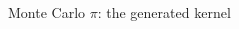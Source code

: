 \documentclass[@BEAMER_OPTIONS@]{beamer}
\begin{document}
\begin{frame}[fragile]{Monte Carlo $\pi$: the generated kernel}
\begin{columns}
\begin{column}[t]{0.3\textwidth}
\begin{exampleblock}{}
                \begin{adjustbox}{width=0.23\textwidth, height=\textheight, keepaspectratio}
                    \begin{minipage}{\textwidth}
                        
                        \vspace{\baselineskip}
                    \end{minipage}
                \end{adjustbox}
            \end{exampleblock}
        \end{column}
    \end{columns}
\end{frame}

\note{}
\end{document}
